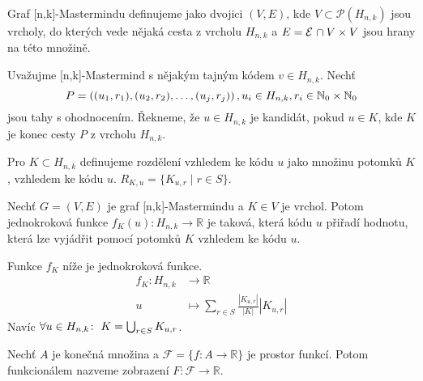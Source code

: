 \begin{definice}\label{grafmastermindu}
  Graf [n,k]-Mastermindu definujeme jako dvojici $(V, E)$, kde $V \subset  \mathcal{P}(H_{n,k})$ jsou vrcholy, do kterých vede nějaká cesta z vrcholu $H_{n,k}$ a $E = \mathcal{E} \hspace{1px} \cap V \times V$ jsou hrany na této množině. 
\end{definice}

\begin{definice}[Kandidát]
    Uvažujme [n,k]-Mastermind s nějakým tajným kódem $v\in H_{n,k}$. Nechť 
    \[P = \left((u_1, r_1), (u_2,r_2), \dots, (u_j,r_j)\right), u_i \in H_{n,k}, r_i \in \mathbb{N} _0 \times \mathbb{N} _0\]
    jsou tahy s ohodnocením. Řekneme, že $u \in H_{n,k}$ je kandidát, pokud $u \in K$, kde $K$ je konec cesty $P$ z vrcholu $H_{n,k}$.
\end{definice}


\begin{definice}[Rozdělení]
    Pro $K \subset H_{n,k}$ definujeme rozdělení vzhledem ke kódu $u$ jako množinu potomků $K$, vzhledem ke kódu $u$. $R_{K,u} = \{K_{u,r} \mid r \in S\}$. 
\end{definice}

\begin{definice}
    Nechť $G = (V,E)$ je graf [n,k]-Mastermindu a $K \in V$ je vrchol. Potom jednokroková funkce $f_K(u) \colon H_{n,k} \to \mathbb{R}$ je taková, která kódu $u$ přiřadí hodnotu, která lze vyjádřit pomocí potomků $K$ vzhledem ke kódu $u$.
\end{definice}

\begin{prikl}\label{prjednokrokfce}
    Funkce $f_K$ níže je jednokroková funkce.
    \begin{align*}
        f_K \colon H_{n,k} &\to \mathbb{R} \\
        u &\mapsto \sum_{r\in S}\frac{|K_{u,r}|}{|K|}|K_{u,r}| 
    \end{align*}
    Navíc $\forall u \in H_{n,k} \colon \hspace{3px} K = \bigcup_{r\in S} K_{u,r}$.
\end{prikl}

\begin{definice}[Funkcionál]
    Nechť $A$ je konečná množina a $\mathcal{F} = \{f\colon A \to \mathbb{R}\}$ je prostor funkcí. Potom funkcionálem nazveme zobrazení $F \colon \mathcal{F} \to \mathbb{R}$. 
\end{definice}

